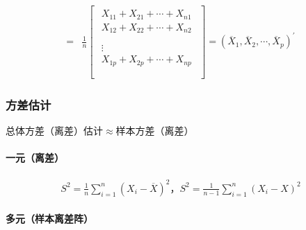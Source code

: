 \documentclass[12pt]{book}
\begin{document}
\begin{align*}
    = & \frac{1}{n} \left[
        \begin{matrix}
            \begin{matrix}
                X_{11}+X_{21}+\cdots+X_{n1} \\
                X_{12}+X_{22}+\cdots+X_{n2} \\
            \end{matrix} \\
            \begin{matrix}
                \vdots                      \\
                X_{1p}+X_{2p}+\cdots+X_{np} \\
            \end{matrix} \\\end{matrix}\right]
    =\left({\overline{X}}_1,{\overline{X}}_2,\cdots,{\overline{X}}_p\right)^\prime
\end{align*}


\subsubsection{方差估计}

总体方差（离差）估计$\approx$样本方差（离差）

\paragraph{一元（离差）}

\begin{gather*}
    S^2=\frac{1}{n}\sum_{i=1}^{n}{(X_i-\overline{X})^2}， S^2=\frac{1}{n-1}\sum_{i=1}^{n}{(X_i-X)^2}
\end{gather*}


\paragraph{多元（样本离差阵）}
\end{document}

